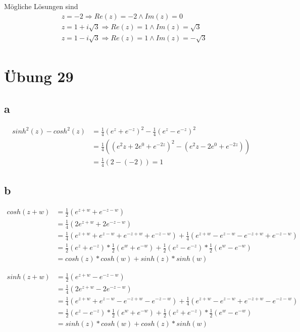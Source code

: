 \documentclass[a4paper,10pt]{article}
\begin{document}
Mögliche Lösungen sind
\begin{align*}
 & z = -2 \Rightarrow Re(z) = -2 \land Im(z) = 0\\
 & z = 1 + i\sqrt{3} \Rightarrow Re(z) = 1 \land Im(z) = \sqrt{3}\\
 & z = 1 - i\sqrt{3} \Rightarrow Re(z) = 1 \land Im(z) = -\sqrt{3}\\
\end{align*}

\section*{Übung 29}

\subsection*{a}

\begin{align}
 sinh^2(z) - cosh^2(z) & = \frac{1}{4}(e^z + e^{-z})^2 - \frac{1}{4}(e^z - e^{-z})^2\\
 & = \frac{1}{4}((e^2z + 2e^0 + e^{-2z})^2 - (e^2z - 2e^0 + e^{-2z}))\\
 & = \frac{1}{4}(2 - (-2)) = 1
\end{align}

\subsection*{b}

\begin{align*}
 cosh(z + w) & = \frac{1}{2}(e^{z + w} + e^{-z - w})\\
 & = \frac{1}{4}(2e^{z + w} + 2e^{-z - w})\\
 & = \frac{1}{4}(e^{z + w} + e^{z - w} + e^{-z + w} + e^{-z - w}) + \frac{1}{4}(e^{z + w} - e^{z - w} - e^{-z + w} + e^{-z -w})\\
 & = \frac{1}{2}(e^{z} + e^{-z}) * \frac{1}{2}(e^{w} + e^{-w}) + \frac{1}{2}(e^{z} - e^{-z}) * \frac{1}{2}(e^{w} - e^{-w})\\
 & = cosh(z) * cosh(w) + sinh(z) * sinh(w)
\end{align*}

\begin{align*}
 sinh(z + w) & = \frac{1}{2}(e^{z + w} - e^{-z - w})\\
 & = \frac{1}{4}(2e^{z + w} - 2e^{-z - w})\\
 & = \frac{1}{4}(e^{z + w} + e^{z - w} - e^{-z + w} - e^{-z - w}) + \frac{1}{4}(e^{z + w} - e^{z - w} + e^{-z + w} - e^{-z -w})\\
 & = \frac{1}{2}(e^{z} - e^{-z}) * \frac{1}{2}(e^{w} + e^{-w}) + \frac{1}{2}(e^{z} + e^{-z}) * \frac{1}{2}(e^{w} - e^{-w})\\
 & = sinh(z) * cosh(w) + cosh(z) * sinh(w)
\end{align*}
\end{document}
